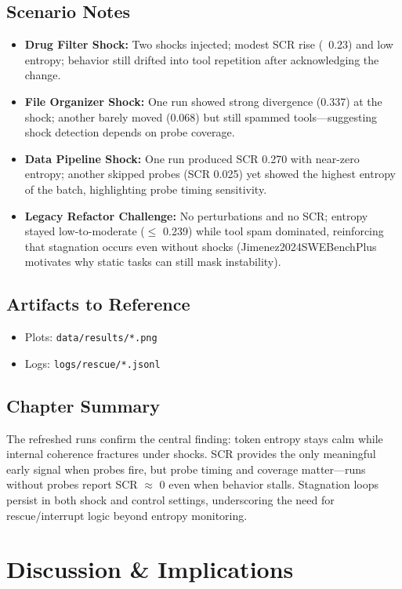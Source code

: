 \documentclass[12pt,a4paper]{report}
\begin{document}
\section{Scenario Notes}
\begin{itemize}
    \item \textbf{Drug Filter Shock:} Two shocks injected; modest SCR rise (~0.23) and low entropy; behavior still drifted into tool repetition after acknowledging the change.
    \item \textbf{File Organizer Shock:} One run showed strong divergence (0.337) at the shock; another barely moved (0.068) but still spammed tools—suggesting shock detection depends on probe coverage.
    \item \textbf{Data Pipeline Shock:} One run produced SCR 0.270 with near-zero entropy; another skipped probes (SCR 0.025) yet showed the highest entropy of the batch, highlighting probe timing sensitivity.
    \item \textbf{Legacy Refactor Challenge:} No perturbations and no SCR; entropy stayed low-to-moderate ($\le$ 0.239) while tool spam dominated, reinforcing that stagnation occurs even without shocks (Jimenez2024SWEBenchPlus motivates why static tasks can still mask instability).
\end{itemize}

\section{Artifacts to Reference}
\begin{itemize}
    \item Plots: \texttt{data/results/*.png}
    \item Logs: \texttt{logs/rescue/*.jsonl}
\end{itemize}

\section{Chapter Summary}
The refreshed runs confirm the central finding: token entropy stays calm while internal coherence fractures under shocks. SCR provides the only meaningful early signal when probes fire, but probe timing and coverage matter—runs without probes report SCR $\approx$ 0 even when behavior stalls. Stagnation loops persist in both shock and control settings, underscoring the need for rescue/interrupt logic beyond entropy monitoring.

\chapter{Discussion & Implications}
\end{document}

